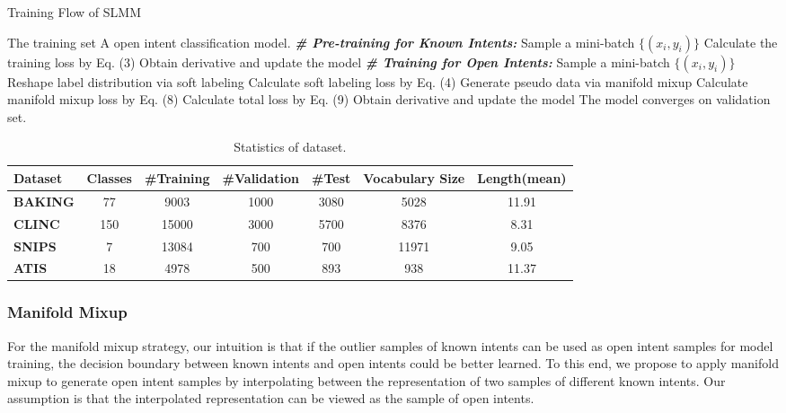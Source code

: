\documentclass[journal]{IEEEtran}
\begin{document}
\begin{algorithm}[t]
\caption{Training Flow of SLMM}
\label{alg:inference}
\begin{algorithmic}[1]
\REQUIRE The training set
\ENSURE A open intent classification model.
\STATE \textbf{\emph{\# Pre-training for Known Intents:}}
\STATE Sample a mini-batch $\{(x_i,y_i)\}$
\STATE Calculate the training loss by Eq. (3)
\STATE Obtain derivative and update the model
\ENDFOR
\STATE \textbf{\emph{\# Training for Open Intents:}}
\STATE Sample a mini-batch $\{(x_i,y_i)\}$
\STATE Reshape label distribution via soft labeling
\STATE Calculate soft labeling loss by Eq. (4)
\STATE Generate pseudo data via manifold mixup
\STATE Calculate manifold mixup loss by Eq. (8)
\STATE Calculate total loss by Eq. (9)
\STATE Obtain derivative and update the model
\ENDFOR
\RETURN The model converges on validation set.
\end{algorithmic}
\end{algorithm}

\begin{table} \setlength{\tabcolsep}{15pt}
\centering
\caption{Statistics of dataset.}\label{statis}
\begin{tabular}{lcccccc}
\toprule
\textbf{Dataset}&\textbf{Classes}&\textbf{\#Training}&\textbf{\#Validation}&\textbf{\#Test}&\textbf{Vocabulary Size}&\textbf{Length(mean)} \\
\midrule
\textbf{BAKING} & 77 &9003&1000&3080&5028&11.91  \\
\textbf{CLINC} & 150 &15000&3000&5700&8376&8.31  \\
\textbf{SNIPS} & 7 & 13084 & 700 & 700 & 11971& 9.05   \\
\textbf{ATIS} & 18 & 4978 & 500 & 893 & 938 & 11.37 \\
\bottomrule
\end{tabular}
\end{table}

\subsubsection{Manifold Mixup}
For the manifold mixup strategy, our intuition is that if the outlier samples of known intents can be used as open intent samples for model training, the decision boundary between known intents and open intents could be better learned.
To this end, we propose to apply manifold mixup to generate open intent samples by interpolating between the representation of two samples of different known intents.
Our assumption is that the interpolated representation can be viewed as the sample of open intents.
\end{document}
